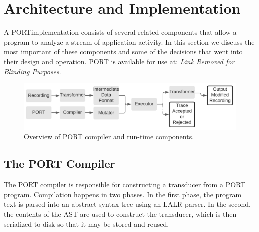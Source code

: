 \section{Architecture and Implementation}

A  PORTimplementation consists of several related
components that allow a program to analyze a stream of
application activity.
In this section we discuss the most important of these components and some
of the decisions that went into their design and operation.
PORT is available for use at: \textit{Link Removed for Blinding Purposes}.
\label{SEC:architecture}

\begin{figure}
\centering
  \includegraphics[scale=.19]{chapter4/images/architecture}
  \caption{Overview of PORT compiler and run-time components.}
  \label{fig:architecture}
\end{figure}

\subsection{The PORT Compiler}

The PORT compiler is responsible for constructing a transducer
from a PORT program.
Compilation happens in two phases.  In the first phase, the program text is
parsed into an abstract syntax tree using an LALR parser.
In the second, the
contents of the AST are used to construct the transducer, which is then serialized to
disk so that it may be stored and reused.

